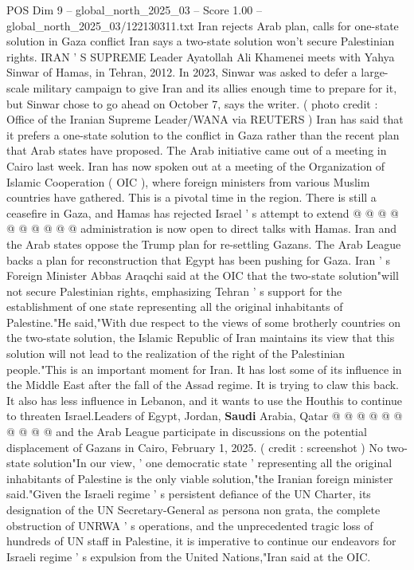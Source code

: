 \begin{textsample}{POS Dim 9 – global\_north\_2025\_03 – Score 1.00 – global\_north\_2025\_03/122130311.txt}  \label{ex:f9_pos_302}
Iran rejects Arab plan, calls for one-state solution in Gaza conflict Iran says a two-state solution won't secure Palestinian rights.
IRAN ' S SUPREME Leader Ayatollah Ali Khamenei meets with Yahya Sinwar of Hamas, in Tehran, 2012.
In 2023, Sinwar was asked to defer a large-scale military campaign to give Iran and its allies enough time to prepare for it, but Sinwar chose to go ahead on October 7, says the writer. ( photo credit : Office of the Iranian Supreme Leader/WANA via REUTERS ) Iran has said that it prefers a one-state solution to the conflict in Gaza rather than the recent plan that Arab states have proposed.
The Arab initiative came out of a meeting in Cairo last week.
Iran has now spoken out at a meeting of the Organization of Islamic Cooperation ( OIC ), where foreign ministers from various Muslim countries have gathered.
This is a pivotal time in the region.
There is still a ceasefire in Gaza, and Hamas has rejected Israel ' s attempt to extend @ @ @ @ @ @ @ @ @ @ administration is now open to direct talks with Hamas.
Iran and the Arab states oppose the Trump plan for re-settling Gazans.
The Arab League backs a plan for reconstruction that Egypt has been pushing for Gaza.
Iran ' s Foreign Minister Abbas Araqchi said at the OIC that the two-state solution"will not secure Palestinian rights, emphasizing Tehran ' s support for the establishment of one state representing all the original inhabitants of Palestine."He said,"With due respect to the views of some brotherly countries on the two-state solution, the Islamic Republic of Iran maintains its view that this solution will not lead to the realization of the right of the Palestinian people."This is an important moment for Iran.
It has lost some of its influence in the Middle East after the fall of the Assad regime.
It is trying to claw this back.
It also has less influence in Lebanon, and it wants to use the Houthis to continue to threaten Israel.Leaders of Egypt, Jordan, \textbf{Saudi} Arabia, Qatar @ @ @ @ @ @ @ @ @ @ and the Arab League participate in discussions on the potential displacement of Gazans in Cairo, February 1, 2025. ( credit : screenshot ) No two-state solution"In our view, ' one democratic state ' representing all the original inhabitants of Palestine is the only viable solution,"the Iranian foreign minister said."Given the Israeli regime ' s persistent defiance of the UN Charter, its designation of the UN Secretary-General as persona non grata, the complete obstruction of UNRWA ' s operations, and the unprecedented tragic loss of hundreds of UN staff in Palestine, it is imperative to continue our endeavors for Israeli regime ' s expulsion from the United Nations,"Iran said at the OIC.

\end{textsample}
